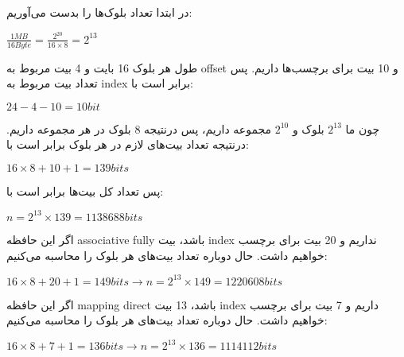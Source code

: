 در ابتدا تعداد بلوک‌ها را بدست می‌آوریم:

\setLTR
$
\frac{1MB}{16Byte} = \frac{2^{20}}{16\times8} = 2^{13} 
$
\setRTL

طول هر بلوک 16 بایت و 4 بیت مربوط به offset و 10 بیت برای برچسب‌ها داریم. پس تعداد بیت مربوط به index برابر است با:

\setLTR
$
24-4-10 = 10bit
$
\setRTL

چون ما $2^{13}$ بلوک و $2^{10}$ مجموعه داریم، پس درنتیجه 8 بلوک در هر مجموعه داریم. درنتیجه تعداد بیت‌های لازم در هر بلوک برابر است با:

\setLTR
$
16\times8+10+1 = 139 bits
$
\setRTL

پس تعداد کل بیت‌ها برابر است با:

\setLTR
$
n = 2^{13} \times139 = 1138688bits
$
\setRTL

اگر این حافظه associative fully باشد، بیت index نداریم و 20 بیت برای برچسب خواهیم داشت. حال دوباره تعداد بیت‌های هر بلوک را محاسبه می‌کنیم:

\setLTR
$
16\times8 + 20 + 1 =149bits \longrightarrow n = 2^{13} \times 149 = 1220608bits
$
\setRTL

اگر این حافظه mapping direct باشد، 13 بیت index داریم و 7 بیت برای برچسب خواهیم داشت. حال دوباره تعداد بیت‌های هر بلوک را محاسبه می‌کنیم:

\setLTR
$
16\times8 + 7 + 1 =136bits \longrightarrow n = 2^{13} \times 136 = 1114112bits
$
\setRTL
















